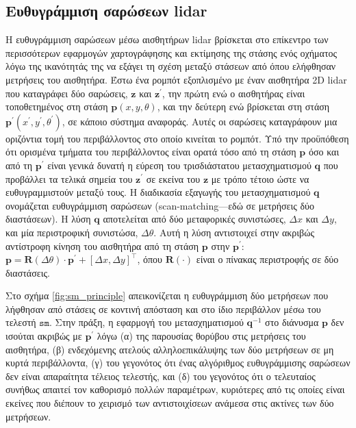 \subsection{Ευθυγράμμιση σαρώσεων lidar}
\label{subsec:01_01_02_5}

Η ευθυγράμμιση σαρώσεων μέσω αισθητήρων lidar βρίσκεται στο επίκεντρο
των περισσότερων εφαρμογών χαρτογράφησης και εκτίμησης
της στάσης ενός οχήματος λόγω της ικανότητάς της να εξάγει τη σχέση μεταξύ
στάσεων από όπου ελήφθησαν μετρήσεις του αισθητήρα. Έστω ένα ρομπότ εξοπλισμένο
με έναν αισθητήρα 2D lidar που καταγράφει δύο σαρώσεις, $\bm{z}$ και
$\bm{z^{\prime}}$, την πρώτη ενώ ο αισθητήρας είναι τοποθετημένος στη στάση
$\bm{p}(x,y,\theta)$, και την δεύτερη ενώ βρίσκεται στη στάση
$\bm{p}^{\prime}(x^{\prime},y^{\prime},\theta^{\prime})$, σε κάποιο σύστημα
αναφοράς. Αυτές οι σαρώσεις καταγράφουν μια οριζόντια τομή του περιβάλλοντος
στο οποίο κινείται το ρομπότ. Υπό την προϋπόθεση ότι ορισμένα τμήματα του
περιβάλλοντος είναι ορατά τόσο από τη στάση $\bm{p}$ όσο και από τη
$\bm{p}^{\prime}$ είναι γενικά δυνατή η εύρεση του τρισδιάστατου
μετασχηματισμού $\bm{q}$ που προβάλλει τα τελικά σημεία του $\bm{z}^{\prime}$
σε εκείνα του $\bm{z}$ με τρόπο τέτοιο ώστε να ευθυγραμμιστούν μεταξύ τους. Η
διαδικασία εξαγωγής του μετασχηματισμού $\bm{q}$ ονομάζεται ευθυγράμμιση
σαρώσεων (scan-matching---εδώ σε μετρήσεις δύο διαστάσεων). Η λύση $\bm{q}$
αποτελείται από δύο μεταφορικές συνιστώσες, $\Delta x$ και $\Delta y$, και μία
περιστροφική συνιστώσα, $\Delta\theta$. Αυτή η λύση αντιστοιχεί στην ακριβώς
αντίστροφη κίνηση του αισθητήρα από τη στάση $\bm{p}$ στην $\bm{p}^{\prime}$:
$\bm{p} = \bm{R}(\Delta\theta) \cdot \bm{p}^{\prime} + [\Delta x, \Delta
y]^{\top}$, όπου $\bm{R}(\cdot)$ είναι ο πίνακας περιστροφής σε δύο διαστάσεις.

Στο σχήμα \ref{fig:sm_principle} απεικονίζεται η ευθυγράμμιση δύο μετρήσεων που
λήφθησαν από στάσεις σε κοντινή απόσταση και στο ίδιο περιβάλλον μέσω του
τελεστή $\texttt{sm}$. Στην πράξη, η εφαρμογή του μετασχηματισμού $\bm{q}^{-1}$
στο διάνυσμα $\bm{p}$ δεν ισούται ακριβώς με $\bm{p}^\prime$ λόγω (α) της
παρουσίας θορύβου στις μετρήσεις του αισθητήρα, (β) ενδεχόμενης ατελούς
αλληλοεπικάλυψης των δύο μετρήσεων σε μη κυρτά περιβάλλοντα, (γ) του γεγονότος
ότι ένας αλγόριθμος ευθυγράμμισης σαρώσεων δεν είναι απαραίτητα τέλειος
τελεστής, και (δ) του γεγονότος ότι ο τελευταίος συνήθως απαιτεί τον καθορισμό
πολλών παραμέτρων, κυριότερες από τις οποίες είναι εκείνες που διέπουν το
χειρισμό των αντιστοιχίσεων ανάμεσα στις ακτίνες των δύο μετρήσεων.

